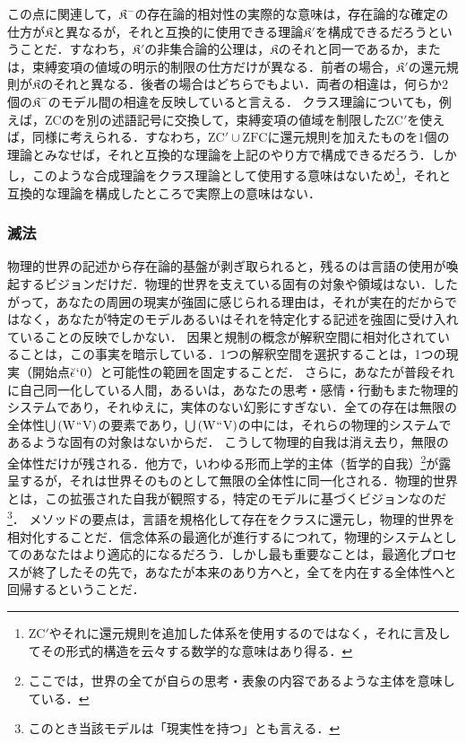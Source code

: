 この点に関連して，$\mathfrak{K}^{-}$の存在論的相対性の実際的な意味は，存在論的な確定の仕方が$\mathfrak{K}$と異なるが，それと互換的に使用できる理論$\mathfrak{K}'$を構成できるだろうということだ．すなわち，$\mathfrak{K}'$の非集合論的公理は，$\mathfrak{K}$のそれと同一であるか，または，束縛変項の値域の明示的制限の仕方だけが異なる．前者の場合，$\mathfrak{K}'$の還元規則が$\mathfrak{K}$のそれと異なる．後者の場合はどちらでもよい．両者の相違は，何らか2個の$\mathfrak{K}^{-}$のモデル間の相違を反映していると言える．
クラス理論についても，例えば，$\mathrm{ZC}$の\kagi{$ \in $}を別の述語記号に交換して，束縛変項の値域を制限した$\mathrm{ZC}'$を使えば，同様に考えられる．すなわち，$\mathrm{ZC}'\cup\mathrm{ZFC}$に還元規則を加えたものを1個の理論とみなせば，それと互換的な理論を上記のやり方で構成できるだろう．しかし，このような合成理論をクラス理論として使用する意味はないため\footnote{
    $\mathrm{ZC}'$やそれに還元規則を追加した体系を使用するのではなく，それに言及してその形式的構造を云々する数学的な意味はあり得る．
}，それと互換的な理論を構成したところで実際上の意味はない．

\subsubsection{滅法}
\label{sssec:滅法}

物理的世界の記述から存在論的基盤が剥ぎ取られると，残るのは言語の使用が喚起するビジョンだけだ．物理的世界を支えている固有の対象や領域はない．したがって，あなたの周囲の現実が強固に感じられる理由は，それが実在的だからではなく，あなたが特定のモデルあるいはそれを特定化する記述を強固に受け入れていることの反映でしかない．
因果と規制の概念が解釈空間に相対化されていることは，この事実を暗示している．1つの解釈空間を選択することは，1つの現実（開始点$ \breve{\epsilon}{\mspace{1mu}{`}\mspace{1mu}} 0 $）と可能性の範囲を固定することだ．
さらに，あなたが普段それに自己同一化している人間，あるいは，あなたの思考・感情・行動もまた物理的システムであり，それゆえに，実体のない幻影にすぎない．全ての存在は無限の全体性${\textstyle\bigcup}\mspace{3mu}(\mathrm{W}{\mspace{1mu}{``}\mspace{1mu}}\mathrm{V})$の要素であり，${\textstyle\bigcup}\mspace{3mu}(\mathrm{W}{\mspace{1mu}{``}\mspace{1mu}}\mathrm{V})$の中には，それらの物理的システムであるような固有の対象はないからだ．
こうして物理的自我は消え去り，無限の全体性だけが残される．他方で，いわゆる形而上学的主体（哲学的自我）\footnote{ここでは，世界の全てが自らの思考・表象の内容であるような主体を意味している．}が露呈するが，それは世界そのものとして無限の全体性に同一化される．物理的世界とは，この拡張された自我が観照する，特定のモデルに基づくビジョンなのだ\footnote{このとき当該モデルは「現実性を持つ」とも言える．}．
メソッドの要点は，言語を規格化して存在をクラスに還元し，物理的世界を相対化することだ．信念体系の最適化が進行するにつれて，物理的システムとしてのあなたはより適応的になるだろう．しかし最も重要なことは，最適化プロセスが終了したその先で，あなたが本来のあり方へと，全てを内在する全体性へと回帰するということだ．

